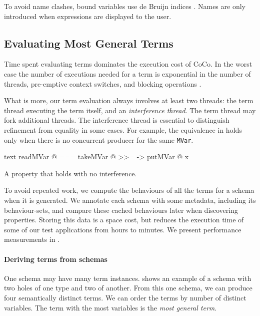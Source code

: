 To avoid name clashes, bound variables use de Bruijn
indices \parencite{debruijn1972}.  Names are only introduced when
expressions are displayed to the user.

\subsection{Evaluating Most General Terms}
\label{sec:coco-hiw-eval}

Time spent evaluating terms dominates the execution cost of CoCo.  In
the worst case the number of executions needed for a term is
exponential in the number of threads, pre-emptive context switches,
and blocking operations \parencite{musuvathi2007}.

What is more, our term evaluation always involves at least two
threads: the term thread executing the term itself, and an
\emph{interference thread}.  The term thread may fork additional
threads.  The interference thread is essential to distinguish
refinement from equality in some cases.  For example, the equivalence
in  holds only when there is no concurrent
producer for the same \verb|MVar|.

\begin{listing}
\centering
\begin{cminted}{text}
readMVar @  ===  takeMVar @ >>= \x -> putMVar @ x
\end{cminted}
\caption{A property that holds with no interference.}\label{lst:prop_mvar3}
\end{listing}

To avoid repeated work, we compute the behaviours of all the terms for
a schema when it is generated.  We annotate each schema with some
metadata, including its behaviour-sets, and compare these cached
behaviours later when discovering properties.  Storing this data is a
space cost, but reduces the execution time of some of our test
applications from hours to minutes.  We present performance
measurements in .

\paragraph{Deriving terms from schemas}
One schema may have many term instances.   shows
an example of a schema with two holes of one type and two of another.
From this one schema, we can produce four semantically distinct terms.
We can order the terms by number of distinct variables.  The term with
the most variables is the \emph{most general term}.


